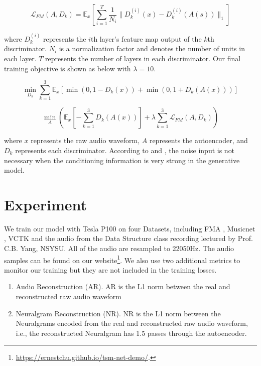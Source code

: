 \documentclass[12pt]{article}
\begin{document}
\begin{equation}
  \mathcal{L}_{FM}\left( A, D_k\right) =
  \mathbb{E}_x\left[\sum_{i=1}^T \frac{1}{N_i}
  \lVert D_k^{(i)}(x) - D_k^{(i)}(A(s))\rVert_1
  \right]
\end{equation}

where $D_k^{(i)}$ represents the $i$th layer's feature map output of the $k$th discriminator. $N_i$ is a normalization factor and denotes the number of units in each layer. $T$ represents the number of layers in each discriminator. Our final training objective is shown as below with $\lambda = 10$.

\begin{equation}
\min_{D_k}\sum_{k=1}^3\mathbb{E}_x\left[
  \min\left( 0, 1 - D_k\left( x\right)\right) +
  \min\left( 0, 1 + D_k\left( A\left( x\right)\right)\right)
\right]
\end{equation}

\begin{equation}
\min_{A}\left(
  \mathbb{E}_x\left[-\sum_{k=1}^3D_k\left( A\left( x \right)\right)\right] +
  \lambda\sum_{k=1}^3\mathcal{L}_{FM}\left( A, D_k\right)
\right)
\end{equation}

where $x$ represents the raw audio waveform, $A$ represents the autoencoder, and $D_k$ represents each discriminator. According to \cite{mat16} and \cite{iso17}, the noise input is not necessary when the conditioning information is very strong in the generative model.

\section{Experiment}
We train our model with Tesla P100 on four Datasets, including FMA \cite{kir16}, Musicnet \cite{joh18}, VCTK \cite{yam19} and the audio from the Data Structure class recording \cite{chu21} lectured by Prof. C.B. Yang, NSYSU. All of the audio are resampled to 22050Hz. The audio samples can be found on our website\footnote{\url{https://ernestchu.github.io/tsm-net-demo/}.}. We also use two additional metrics to monitor our training but they are not included in the training losses.
\begin{enumerate}
  \item{Audio Reconstruction (AR). AR is the L1 norm between the real and reconstructed raw audio waveform}
  \item{Neuralgram Reconstruction (NR). NR is the L1 norm between the Neuralgrams encoded from the real and reconstructed raw audio waveform, i.e., the reconstructed Neuralgram has 1.5 passes through the autoencoder.}
\end{enumerate}
\end{document}
